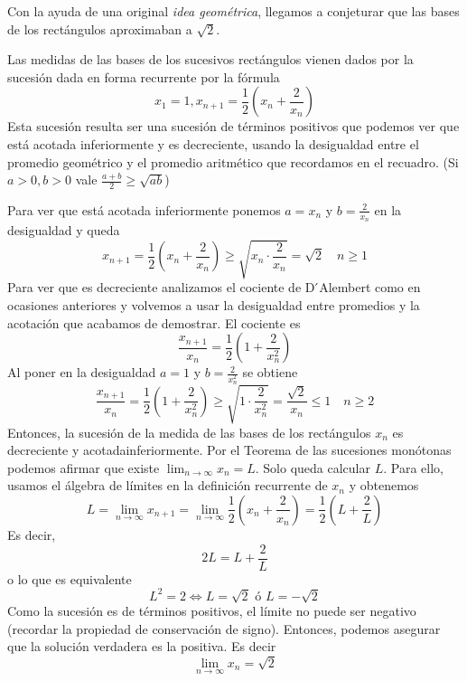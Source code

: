\documentclass[../Teoría.root.tex]{subfiles}
\begin{document}
Con la ayuda de una original \textit{idea geométrica}, llegamos a conjeturar que las bases de los rectángulos aproximaban a \(\sqrt{2}\).

Las medidas de las bases de los sucesivos rectángulos vienen dados por la sucesión dada en forma recurrente por la fórmula
\[x_1=1,x_{n+1}=\frac{1}{2}\left(x_n+\frac{2}{x_n}\right)\]
Esta sucesión resulta ser una sucesión de términos positivos que podemos ver que está acotada inferiormente y es decreciente, usando la desigualdad entre el promedio geométrico y el promedio aritmético que recordamos en el recuadro.
(Si \(a>0,b>0\) vale \(\frac{a+b}{2}\geq\sqrt{ab}\))

Para ver que está acotada inferiormente ponemos \(a=x_n\) y \(b=\frac{2}{x_n}\) en la desigualdad y queda
\[x_{n+1}=\frac{1}{2}\left(x_n+\frac{2}{x_n}\right)\geq\sqrt{x_n\cdot\frac{2}{x_n}}=\sqrt{2}\quad n\geq1\]
Para ver que es decreciente analizamos el cociente de D ́Alembert como en ocasiones anteriores y volvemos a usar la desigualdad entre promedios y la acotación que acabamos de demostrar.
El cociente es
\[\frac{x_{n+1}}{x_n}=\frac{1}{2}\left(1+\frac{2}{x^2_n}\right)\]
Al poner en la desigualdad \(a=1\) y \(b=\frac{2}{x^2_n}\) se obtiene
\[\frac{x_{n+1}}{x_n}=\frac{1}{2}\left(1+\frac{2}{x^2_n}\right)\geq\sqrt{1\cdot\frac{2}{x^2_n}}=\frac{\sqrt{2}}{x_n}\leq1\quad n\geq2\]
Entonces, la sucesión de la medida de las bases de los rectángulos \(x_n\) es decreciente y acotadainferiormente.
Por el Teorema de las sucesiones monótonas podemos afirmar que existe \(\lim_{n\to\infty}x_n=L\).
Solo queda calcular \(L\).
Para ello, usamos el álgebra de límites en la definición recurrente de \(x_n\) y obtenemos
\[L=\lim_{n\to\infty}x_{n+1}=\lim_{n\to\infty}\frac{1}{2}\left(x_n+\frac{2}{x_n}\right)=\frac{1}{2}\left(L+\frac{2}{L}\right)\]
Es decir,
\[2L=L+\frac{2}{L}\]
o lo que es equivalente
\[L^2=2\Longleftrightarrow L=\sqrt{2}\text{ ó }L=-\sqrt{2}\]
Como la sucesión es de términos positivos, el límite no puede ser negativo (recordar la propiedad de conservación de signo).
Entonces, podemos asegurar que la solución verdadera es la positiva.
Es decir
\[\lim_{n\to\infty}x_n=\sqrt{2}\]
\end{document}
